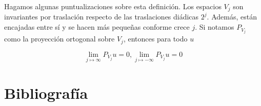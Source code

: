 \begin{itemize}
Hagamos algunas puntualizaciones sobre esta definición. Los espacios $V_j$ son invariantes por traslación respecto de las traslaciones diádicas $2^j$. Además, están encajadas entre sí y se hacen más pequeñas conforme crece $j$. Si notamos $P_{V_j}$ como la proyección ortogonal sobre $V_j$, entonces para todo $u$ 

$$\lim_{j \mapsto \infty} P_{V_j} u = 0, \lim_{j \mapsto -\infty} P_{V_j} u = 0$$
\end{itemize}
\newpage
\section{Bibliografía}







\appendix
\clearpage
\addappheadtotoc
\appendixpage



 


